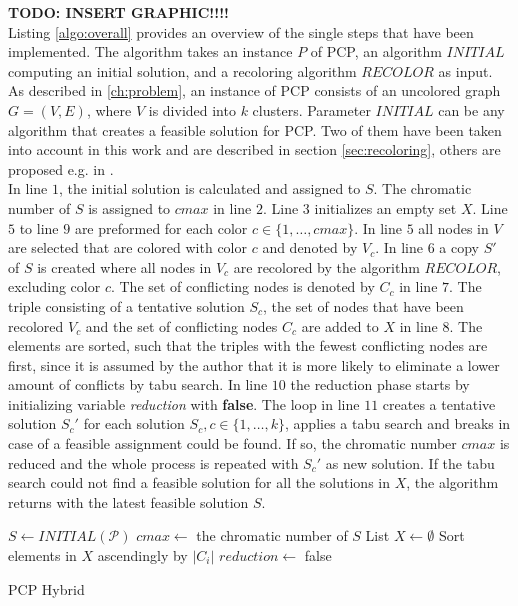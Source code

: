 \textbf{TODO: INSERT GRAPHIC!!!!}\\

Listing \ref{algo:overall} provides an overview of the single steps that have been implemented. The algorithm takes an instance $P$ of PCP, an algorithm $INITIAL$ computing an initial solution, and a recoloring algorithm $RECOLOR$ as input. As described in \ref{ch:problem}, an instance of PCP consists of an uncolored graph $G=(V,E)$, where $V$ is divided into $k$ clusters. Parameter $INITIAL$ can be any algorithm that creates a feasible solution for PCP. Two of them have been taken into account in this work and are described in section \ref{sec:recoloring}, others are proposed e.g. in \cite{li-00}.\\
In line $1$, the initial solution is calculated and assigned to $S$. The chromatic number of $S$ is assigned to $cmax$ in line $2$. Line $3$ initializes an empty set $X$. Line $5$ to line $9$ are preformed for each color $c \in \{1,\ldots , cmax\}$. In line $5$ all nodes in $V$ are selected that are colored with color $c$ and denoted by $V_c$. In line $6$ a copy $S'$ of $S$ is created where all nodes in $V_c$ are recolored by the algorithm $RECOLOR$, excluding color $c$. The set of conflicting nodes is denoted by $C_c$ in line $7$. The triple consisting of a tentative solution $S_c$, the set of nodes that have been recolored $V_c$ and the set of conflicting nodes $C_c$ are added to $X$ in line $8$. The elements are sorted, such that the triples with the fewest conflicting nodes are first, since it is assumed by the author that it is more likely to eliminate a lower amount of conflicts by tabu search. In line $10$ the reduction phase starts by initializing variable \textit{reduction} with \textbf{false}. The loop in line $11$ creates a tentative solution $S_c'$ for each solution $S_c, c\in \{1,\ldots ,k\}$, applies a tabu search and breaks in case of a feasible assignment could be found. If so, the chromatic number $cmax$ is reduced and the whole process is repeated with $S_c'$ as new solution. If the tabu search could not find a feasible solution for all the solutions in $X$, the algorithm returns with the latest feasible solution $S$.

\begin{algorithm}[h]
$S \gets INITIAL(\mathcal{P})$\;
$cmax \gets$ the chromatic number of $S$\;
List $X \gets \emptyset $\;
Sort elements in $X$ ascendingly by $|C_i|$\;
$reduction \gets$ false\;
\;
\caption{PCP Hybrid}
\label{algo:overall}
\end{algorithm}

